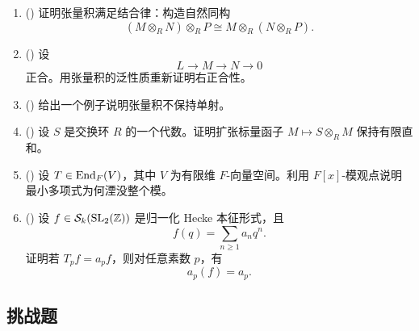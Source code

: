 \begin{enumerate}[label=\textbf{10.\arabic*.}, leftmargin=3.2em, start=26]
  \item (\medium) 证明张量积满足结合律：构造自然同构
  \[
  (M\otimes_R N)\otimes_R P\cong M\otimes_R (N\otimes_R P).
  \]

  \item (\medium) 设
  \[
  L\to M\to N\to 0
  \]
  正合。用张量积的泛性质重新证明右正合性。

  \item (\medium) 给出一个例子说明张量积不保持单射。

  \item (\medium) 设 $S$ 是交换环 $R$ 的一个代数。证明扩张标量函子 $M\mapsto S\otimes_R M$ 保持有限直和。

  \item (\medium) 设 $T\in \mathrm{End}_F(V)$，其中 $V$ 为有限维 $F$-向量空间。利用 $F[x]$-模观点说明最小多项式为何湮没整个模。

  \item (\medium) 设 $f\in \mathcal{S}_k(\mathrm{SL}_2(\mathbb{Z}))$ 是归一化 Hecke 本征形式，且
  \[
  f(q)=\sum_{n\ge 1} a_nq^n.
  \]
  证明若 $T_pf=a_pf$，则对任意素数 $p$，有
  \[
  a_p(f)=a_p.
  \]
\end{enumerate}

\subsection*{挑战题}

